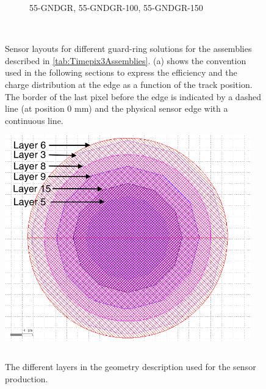 \begin{figure}[htbp]
\begin{subfigure}[t]{0.5\textwidth}
\begin{tikzpicture}
    \end{tikzpicture}
    \caption{55-GNDGR, 55-GNDGR-100, 55-GNDGR-150}
    \label{fig:Layout50_GNDGR}
  \end{subfigure}~
  \caption{Sensor layouts for different guard-ring solutions for the
    assemblies described in \cref{tab:Timepix3Assemblies}. (a) shows
    the convention used in the following sections to express the
    efficiency and the charge distribution at the edge as a function
    of the track position. The border of the last pixel before the
    edge is indicated by a dashed line (at position 0 mm) and the
    physical sensor edge with a continuous line.}
  \label{fig:Layout_guard_ring}
\end{figure}


\begin{figure}[htbp]
  \centering
  \begin{minipage}[t]{.4\textwidth}
    \centering
    \vspace{0pt}
    \includegraphics[width=0.95\textwidth]{figures/ActiveEdge/pixelLayout_withLayers.png}
    \caption{The different layers in the geometry description used for
      the sensor production.}
    \label{fig:PixelLayout}
  \end{minipage}
  \hfill
  \begin{minipage}[t]{.56\textwidth}
    \centering
    \vspace{0pt}
    \label{tab:PixelStackDimensions}
    \begin{tabular}{l c c}

\end{tabular}
\end{minipage}
\end{figure}
